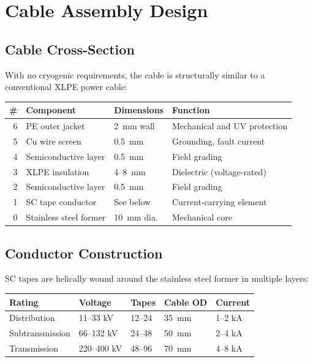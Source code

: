 \documentclass[11pt, a4paper]{article}
\begin{document}
\section{Cable Assembly Design}
\label{sec:cable}

\subsection{Cable Cross-Section}

With no cryogenic requirements, the cable is structurally
similar to a conventional XLPE power cable:

\begin{center}
\begin{tabular}{@{}rlll@{}}
\toprule
\textbf{\#} & \textbf{Component} & \textbf{Dimensions} & \textbf{Function} \\
\midrule
6 & PE outer jacket & 2~mm wall & Mechanical and UV protection \\
5 & Cu wire screen & 0.5~mm & Grounding, fault current \\
4 & Semiconductive layer & 0.5~mm & Field grading \\
3 & XLPE insulation & 4--8~mm & Dielectric (voltage-rated) \\
2 & Semiconductive layer & 0.5~mm & Field grading \\
1 & SC tape conductor & See below & Current-carrying element \\
0 & Stainless steel former & 10~mm dia. & Mechanical core \\
\bottomrule
\end{tabular}
\end{center}

\subsection{Conductor Construction}

SC tapes are helically wound around the stainless steel former in
multiple layers:

\begin{center}
\begin{tabular}{@{}lllll@{}}
\toprule
\textbf{Rating} & \textbf{Voltage} & \textbf{Tapes} & \textbf{Cable OD} &
  \textbf{Current} \\
\midrule
Distribution & 11--33 kV & 12--24 & 35~mm & 1--2 kA \\
Subtransmission & 66--132 kV & 24--48 & 50~mm & 2--4 kA \\
Transmission & 220--400 kV & 48--96 & 70~mm & 4--8 kA \\
\bottomrule
\end{tabular}
\end{center}
\end{document}

